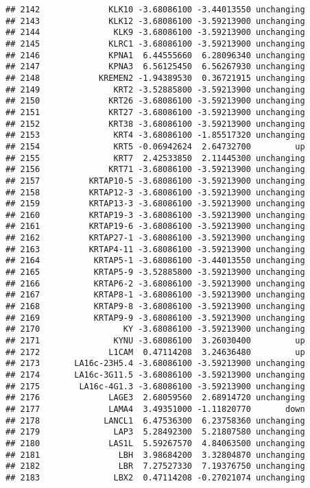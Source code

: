 \documentclass[]{article}
\begin{document}
\begin{verbatim}
## 2142              KLK10 -3.68086100 -3.44013550 unchanging
## 2143              KLK12 -3.68086100 -3.59213900 unchanging
## 2144               KLK9 -3.68086100 -3.59213900 unchanging
## 2145              KLRC1 -3.68086100 -3.59213900 unchanging
## 2146              KPNA1  6.44555660  6.28096340 unchanging
## 2147              KPNA3  6.56125450  6.56267930 unchanging
## 2148            KREMEN2 -1.94389530  0.36721915 unchanging
## 2149               KRT2 -3.52885800 -3.59213900 unchanging
## 2150              KRT26 -3.68086100 -3.59213900 unchanging
## 2151              KRT27 -3.68086100 -3.59213900 unchanging
## 2152              KRT38 -3.68086100 -3.59213900 unchanging
## 2153               KRT4 -3.68086100 -1.85517320 unchanging
## 2154               KRT5 -0.06942624  2.64732700         up
## 2155               KRT7  2.42533850  2.11445300 unchanging
## 2156              KRT71 -3.68086100 -3.59213900 unchanging
## 2157          KRTAP10-5 -3.68086100 -3.59213900 unchanging
## 2158          KRTAP12-3 -3.68086100 -3.59213900 unchanging
## 2159          KRTAP13-3 -3.68086100 -3.59213900 unchanging
## 2160          KRTAP19-3 -3.68086100 -3.59213900 unchanging
## 2161          KRTAP19-6 -3.68086100 -3.59213900 unchanging
## 2162          KRTAP27-1 -3.68086100 -3.59213900 unchanging
## 2163          KRTAP4-11 -3.68086100 -3.59213900 unchanging
## 2164           KRTAP5-1 -3.68086100 -3.44013550 unchanging
## 2165           KRTAP5-9 -3.52885800 -3.59213900 unchanging
## 2166           KRTAP6-2 -3.68086100 -3.59213900 unchanging
## 2167           KRTAP8-1 -3.68086100 -3.59213900 unchanging
## 2168           KRTAP9-8 -3.68086100 -3.59213900 unchanging
## 2169           KRTAP9-9 -3.68086100 -3.59213900 unchanging
## 2170                 KY -3.68086100 -3.59213900 unchanging
## 2171               KYNU -3.68086100  3.26030400         up
## 2172              L1CAM  0.47114208  3.24636480         up
## 2173       LA16c-23H5.4 -3.68086100 -3.59213900 unchanging
## 2174       LA16c-3G11.5 -3.68086100 -3.59213900 unchanging
## 2175        LA16c-4G1.3 -3.68086100 -3.59213900 unchanging
## 2176              LAGE3  2.68059560  2.68914720 unchanging
## 2177              LAMA4  3.49351000 -1.11820770       down
## 2178             LANCL1  6.47536300  6.23758360 unchanging
## 2179               LAP3  5.28492300  5.21807580 unchanging
## 2180              LAS1L  5.59267570  4.84063500 unchanging
## 2181                LBH  3.98684200  3.32804870 unchanging
## 2182                LBR  7.27527330  7.19376750 unchanging
## 2183               LBX2  0.47114208 -0.27021074 unchanging

\end{verbatim}
\end{document}

